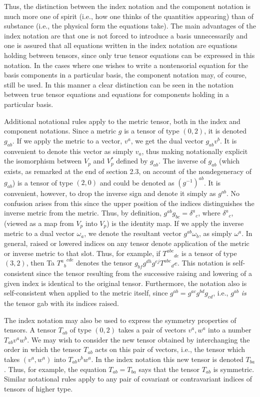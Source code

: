 Thus, the distinction between the index notation and the component notation is much more one of spirit (i.e., how one thinks of the quantities appearing) than of substance (i.e., the physical form the equations take). The main advantages of the index notation are that one is not forced to introduce a basis unnecessarily and one is assured that all equations written in the index notation are equations holding between tensors, since only true tensor equations can be expressed in this notation. In the cases where one wishes to write a nontensorial equation for the basis components in a particular basis, the component notation may, of course, still be used. In this manner a clear distinction can be seen in the notation between true tensor equations and equations for components holding in a particular basis. 

Additional notational rules apply to the metric tensor, both in the index and component notations. Since a metric $g$ is a tensor of type $(0, 2)$, it is denoted $g_{ab}$. If we apply the metric to a vector, $v^a$, we get the dual vector $g_{ab}v^b$. It is convenient to denote this vector as simply $v_a$, thus making notationally explicit the isomorphism between $V_p$ and $V_p^*$ defined by $g_{ab}$. The inverse of $g_{ab}$ (which exists, as remarked at the end of section 2.3, on account of the nondegeneracy of $g_{ab}$) is a tensor of type $(2,0)$ and could be denoted as $(g^{-1})^{ab}$. It is convenient, however, to drop the inverse sign and denote it simply as $g^{ab}$. No confusion arises from this since the upper position of the indices distinguishes the inverse metric from the metric. Thus, by definition, $g^{ab}g_{bc}={\delta^a}_c$, where ${\delta^a}_c$, (viewed as a map from $V_p$ into $V_p$) is the identity map. If we apply the inverse metric to a dual vector $\omega_a$, we denote the resultant vector $g^{ab}\omega_b$, as simply $\omega^a$. In general, raised or lowered indices on any tensor denote application of the metric or inverse metric to that slot. Thus, for example, if ${T^{abc}}_{de}$ is a tensor of type $(3,2)$, then Ta ${{T^a}_b}^{cde}$ denotes the tensor $g_{bf}g^{dh}g^{ej}{T^{abc}}_de$. This notation is self-consistent since the tensor resulting from the successive raising and lowering of a given index is identical to the original tensor. Furthermore, the notation also is self-consistent when applied to the metric itself, since $g^{ab}=g^{ac}g^{bd}g_{cd}$, i.e., $g^{ab}$ \emph{is} the tensor gab with its indices raised.

The index notation may also be used to express the symmetry properties of tensors. A tensor $T_{ab}$ of type $(0,2)$ takes a pair of vectors $v^a,w^a$ into a number $T_{ab}v^aw^b$. We may wish to consider the new tensor obtained by interchanging the order in which the tensor $T_{ab}$ acts on this pair of vectors, i.e., the tensor which takes $(v^a,w^a)$ into $T_{ab}v^bw^a$. In the index notation this new tensor is denoted $T_{ba}$. Thus, for example, the equation $T_{ab}=T_{ba}$ says that the tensor $T_{ab}$ is symmetric. Similar notational rules apply to any pair of covariant or contravariant indices of tensors of higher type.

